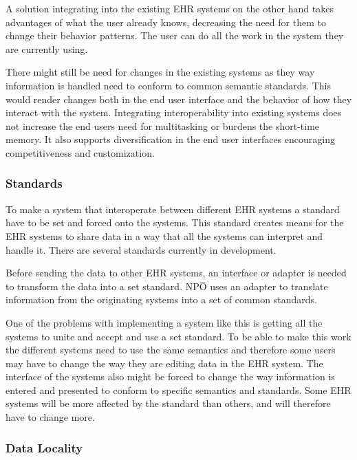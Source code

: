 \documentclass[14pt]{article}
\begin{document}
A solution integrating into the existing \gls{EHR} systems on the other hand takes advantages of what the user already knows, decreasing the need for them to change their behavior patterns. The user can do all the work in the system they are currently using.

There might still be need for changes in the existing systems as they way information is handled need to conform to common semantic standards. This would render changes both in the end user interface and the behavior of how they interact with the system. Integrating interoperability into existing systems does not increase the end users need for multitasking or burdens the short-time memory. It also supports diversification in the end user interfaces encouraging competitiveness and customization.

\subsubsection{Standards}
\label{sec:resultsStandards}
To make a system that interoperate between different \gls{EHR} systems a standard have to be set and forced onto the systems. This standard creates means for the \gls{EHR} systems to share data in a way that all the systems can interpret and handle it. There are several standards currently in development.

Before sending the data to other \gls{EHR} systems, an interface or adapter is needed to transform the data into a set standard. NPÖ uses an adapter to translate information from the originating systems into a set of common standards. 

One of the problems with implementing a system like this is getting all the systems to unite and accept and use a set standard. To be able to make this work the different systems need to use the same semantics and therefore some users may have to change the way they are editing data in the \gls{EHR} system. The interface of the systems also might be forced to change the way information is entered and presented to conform to specific semantics and standards. Some \gls{EHR} systems will be more affected by the standard than others, and will therefore have to change more.

\subsubsection{Data Locality}
\label{sec:resultsLocality}
\end{document}
